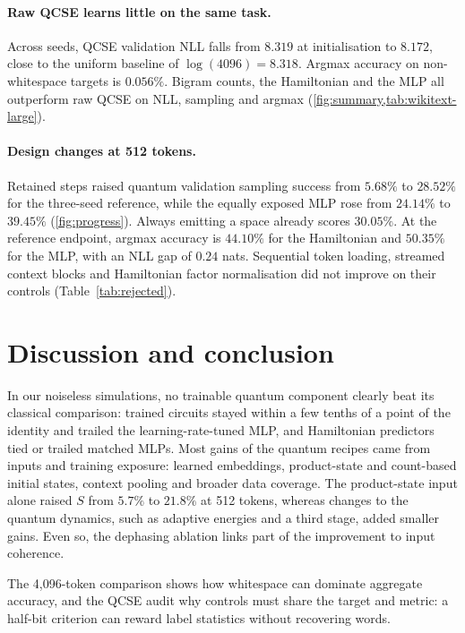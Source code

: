 \documentclass[11pt,a4paper]{article}
\begin{document}
\paragraph{Raw QCSE learns little on the same task.}
Across seeds, QCSE validation NLL falls from $8.319$ at initialisation to $8.172$, close to the uniform baseline of $\log(4096)=8.318$. Argmax accuracy on non-whitespace targets is $0.056\%$. Bigram counts, the Hamiltonian and the MLP all outperform raw QCSE on NLL, sampling and argmax (\cref{fig:summary,tab:wikitext-large}).

\paragraph{Design changes at 512 tokens.}
Retained steps raised quantum validation sampling success from $5.68\%$ to $28.52\%$ for the three-seed reference, while the equally exposed MLP rose from $24.14\%$ to $39.45\%$ (\cref{fig:progress}). Always emitting a space already scores $30.05\%$. At the reference endpoint, argmax accuracy is $44.10\%$ for the Hamiltonian and $50.35\%$ for the MLP, with an NLL gap of $0.24$ nats. Sequential token loading, streamed context blocks and Hamiltonian factor normalisation did not improve on their controls (Table~\ref{tab:rejected}).

\section{Discussion and conclusion}
\label{sec:discussion}

In our noiseless simulations, no trainable quantum component clearly beat its classical comparison: trained circuits stayed within a few tenths of a point of the identity and trailed the learning-rate-tuned MLP, and Hamiltonian predictors tied or trailed matched MLPs. Most gains of the quantum recipes came from inputs and training exposure: learned embeddings, product-state and count-based initial states, context pooling and broader data coverage. The product-state input alone raised $S$ from $5.7\%$ to $21.8\%$ at 512 tokens, whereas changes to the quantum dynamics, such as adaptive energies and a third stage, added smaller gains. Even so, the dephasing ablation links part of the improvement to input coherence.

The 4,096-token comparison shows how whitespace can dominate aggregate accuracy, and the QCSE audit why controls must share the target and metric: a half-bit criterion can reward label statistics without recovering words.
\end{document}
